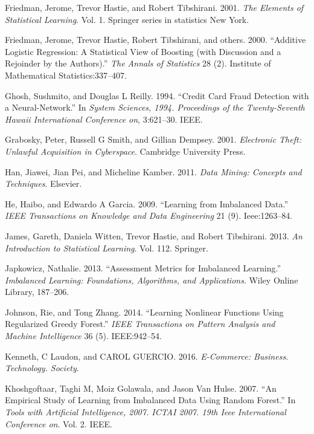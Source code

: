 \documentclass[12pt,]{article}
\begin{document}
\leavevmode\hypertarget{ref-friedman2001elements}{}%
Friedman, Jerome, Trevor Hastie, and Robert Tibshirani. 2001. \emph{The
Elements of Statistical Learning}. Vol. 1. Springer series in statistics
New York.

\leavevmode\hypertarget{ref-friedman2000additive}{}%
Friedman, Jerome, Trevor Hastie, Robert Tibshirani, and others. 2000.
``Additive Logistic Regression: A Statistical View of Boosting (with
Discussion and a Rejoinder by the Authors).'' \emph{The Annals of
Statistics} 28 (2). Institute of Mathematical Statistics:337--407.

\leavevmode\hypertarget{ref-ghosh1994credit}{}%
Ghosh, Sushmito, and Douglas L Reilly. 1994. ``Credit Card Fraud
Detection with a Neural-Network.'' In \emph{System Sciences, 1994.
Proceedings of the Twenty-Seventh Hawaii International Conference on},
3:621--30. IEEE.

\leavevmode\hypertarget{ref-grabosky2001electronic}{}%
Grabosky, Peter, Russell G Smith, and Gillian Dempsey. 2001.
\emph{Electronic Theft: Unlawful Acquisition in Cyberspace}. Cambridge
University Press.

\leavevmode\hypertarget{ref-han2011data}{}%
Han, Jiawei, Jian Pei, and Micheline Kamber. 2011. \emph{Data Mining:
Concepts and Techniques}. Elsevier.

\leavevmode\hypertarget{ref-he2009learning}{}%
He, Haibo, and Edwardo A Garcia. 2009. ``Learning from Imbalanced
Data.'' \emph{IEEE Transactions on Knowledge and Data Engineering} 21
(9). Ieee:1263--84.

\leavevmode\hypertarget{ref-james2013introduction}{}%
James, Gareth, Daniela Witten, Trevor Hastie, and Robert Tibshirani.
2013. \emph{An Introduction to Statistical Learning}. Vol. 112.
Springer.

\leavevmode\hypertarget{ref-japkowicz2013assessment}{}%
Japkowicz, Nathalie. 2013. ``Assessment Metrics for Imbalanced
Learning.'' \emph{Imbalanced Learning: Foundations, Algorithms, and
Applications}. Wiley Online Library, 187--206.

\leavevmode\hypertarget{ref-johnson2014learning}{}%
Johnson, Rie, and Tong Zhang. 2014. ``Learning Nonlinear Functions Using
Regularized Greedy Forest.'' \emph{IEEE Transactions on Pattern Analysis
and Machine Intelligence} 36 (5). IEEE:942--54.

\leavevmode\hypertarget{ref-kenneth2016commerce}{}%
Kenneth, C Laudon, and CAROL GUERCIO. 2016. \emph{E-Commerce: Business.
Technology. Society}.

\leavevmode\hypertarget{ref-khoshgoftaar2007empirical}{}%
Khoshgoftaar, Taghi M, Moiz Golawala, and Jason Van Hulse. 2007. ``An
Empirical Study of Learning from Imbalanced Data Using Random Forest.''
In \emph{Tools with Artificial Intelligence, 2007. ICTAI 2007. 19th Ieee
International Conference on}. Vol. 2. IEEE.
\end{document}
